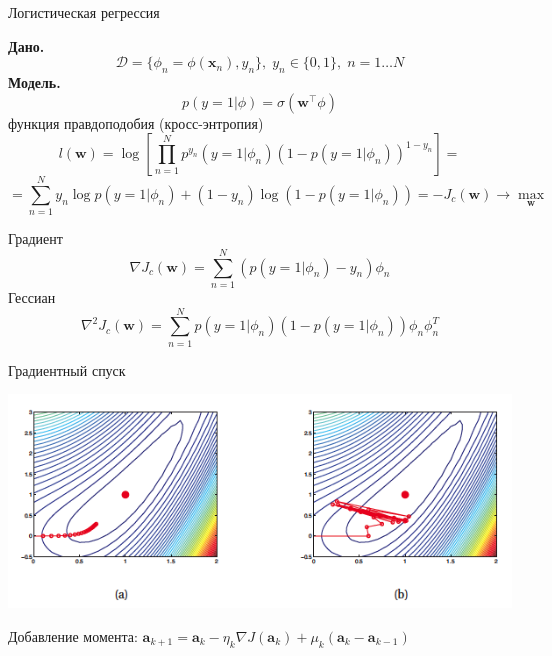 \documentclass[aspectratio=169]{beamer}
\begin{document}
\begin{frame}{Логистическая регрессия}

{\bf Дано.}
\[
\mathcal{D} = \{\phi_n = \phi(\mathbf{x}_n), y_n\}, \; y_n \in \{ 0,1\}, \; n = 1 \ldots N
\]
{\bf Модель.}
\[
p(y=1 | \phi) = \sigma(\mathbf{w}^\top \phi)
\]
функция правдоподобия (кросс-энтропия)
\[
l(\mathbf{w}) = \log \left[ \prod_{n=1}^N p^{y_n}(y=1 | \phi_n) (1 - p(y=1 | \phi_n))^{1 - y_n}\right] = 
\]
\[
= \sum_{n=1}^N {y_n \log p(y=1 | \phi_n) + (1- y_n) \log (1 - p(y=1 | \phi_n))} = - J_c(\mathbf{w}) \rightarrow \max_{\mathbf{w}}
\]

\end{frame}

\begin{frame}

Градиент
\[
\nabla J_c(\mathbf{w}) = \sum_{n=1}^N (p(y=1 | \phi_n) - y_n) \phi_n
\]
Гессиан
\[
\nabla^2 J_c(\mathbf{w}) = \sum_{n=1}^N p(y=1 | \phi_n) (1 - p(y=1 | \phi_n)) \phi_n \phi_n^T
\]

\end{frame}


\begin{frame}{Градиентный спуск}

\begin{small}
\gd
\end{small}

\end{frame}

\begin{frame}

\begin{center}
   		\includegraphics[scale=0.5]{images/gd.png}   		
\end{center}
    
Добавление момента: $\mathbf{a}_{k+1} = \mathbf{a}_k - \eta_k \nabla J (\mathbf{a}_k) + \mu_k (\mathbf{a}_{k} - \mathbf{a}_{k-1})$

\end{frame}
\end{document}
